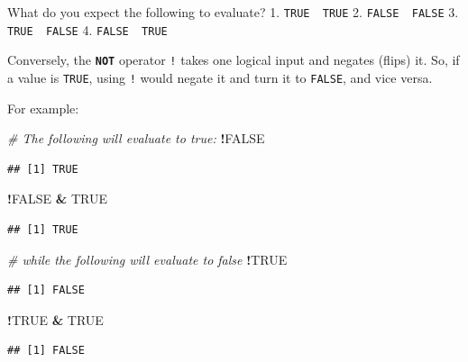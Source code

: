 \documentclass[
]{book}
\newenvironment{Shaded}{\begin{snugshade}}{\end{snugshade}}
\newcommand{\CommentTok}[1]{\textcolor[rgb]{0.56,0.35,0.01}{\textit{#1}}}
\newcommand{\ConstantTok}[1]{\textcolor[rgb]{0.56,0.35,0.01}{#1}}
\newcommand{\SpecialCharTok}[1]{\textcolor[rgb]{0.81,0.36,0.00}{\textbf{#1}}}
\begin{document}
What do you expect the following to evaluate?
1. \texttt{TRUE\ \textbar{}\ TRUE}
2. \texttt{FALSE\ \textbar{}\ FALSE}
3. \texttt{TRUE\ \textbar{}\ FALSE}
4. \texttt{FALSE\ \textbar{}\ TRUE}

Conversely, the \textbf{\texttt{NOT}} operator \texttt{!} takes one logical input and negates (flips) it. So, if a value is \texttt{TRUE}, using \texttt{!} would negate it and turn it to \texttt{FALSE}, and vice versa.

For example:

\begin{Shaded}
\begin{Highlighting}[]
\CommentTok{\# The following will evaluate to true:}
\SpecialCharTok{!}\ConstantTok{FALSE} 
\end{Highlighting}
\end{Shaded}

\begin{verbatim}
## [1] TRUE
\end{verbatim}

\begin{Shaded}
\begin{Highlighting}[]
\SpecialCharTok{!}\ConstantTok{FALSE} \SpecialCharTok{\&} \ConstantTok{TRUE}
\end{Highlighting}
\end{Shaded}

\begin{verbatim}
## [1] TRUE
\end{verbatim}

\begin{Shaded}
\begin{Highlighting}[]
\CommentTok{\# while the following will evaluate to false}
\SpecialCharTok{!}\ConstantTok{TRUE}
\end{Highlighting}
\end{Shaded}

\begin{verbatim}
## [1] FALSE
\end{verbatim}

\begin{Shaded}
\begin{Highlighting}[]
\SpecialCharTok{!}\ConstantTok{TRUE} \SpecialCharTok{\&} \ConstantTok{TRUE}
\end{Highlighting}
\end{Shaded}

\begin{verbatim}
## [1] FALSE
\end{verbatim}
\end{document}
